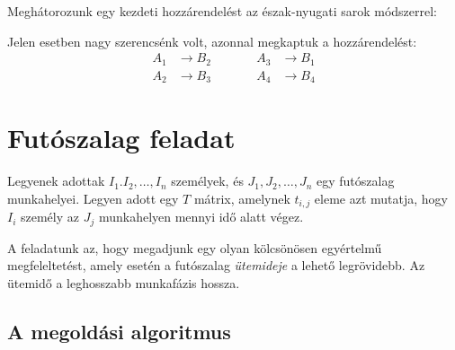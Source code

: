 \documentclass[a4paper,12pt,svgnames]{report}
\begin{document}
\begin{multicols}{2}
\begin{megoldas}
Meghátorozunk egy kezdeti hozzárendelést az észak-nyugati sarok módszerrel:
\begin{center}
\end{center}

Jelen esetben nagy szerencsénk volt, azonnal megkaptuk a hozzárendelést:
\begin{alignat*}{4}
A_1&\rightarrow B_2&\qquad&A_3&\rightarrow B_1\\
A_2&\rightarrow B_3&\qquad&A_4&\rightarrow B_4
\end{alignat*}
\end{megoldas}

\section{Futószalag feladat}

\firstline Legyenek adottak $I_1.I_2,\ldots,I_n$ személyek, és $J_1,J_2,\ldots,J_n$ egy futószalag munkahelyei. Legyen adott egy $T$ mátrix, amelynek $t_{i,j}$ eleme azt mutatja, hogy $I_i$ személy az $J_j$ munkahelyen mennyi idő alatt végez.

A feladatunk az, hogy megadjunk egy olyan kölcsönösen egyértelmű megfeleltetést, amely esetén a futószalag \emph{ütemideje} a lehető legrövidebb. Az ütemidő a leghosszabb munkafázis hossza.

\subsection{A megoldási algoritmus}


\end{multicols}
\end{document}

